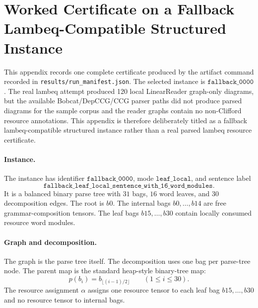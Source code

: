 \section{Worked Certificate on a Fallback Lambeq-Compatible Structured Instance}
\label{app:worked-experiment-certificate}

This appendix records one complete certificate produced by the artifact command recorded in \texttt{results/run\_manifest.json}.
The selected instance is \(\texttt{fallback\_0000}\). The real lambeq attempt produced 120 local LinearReader graph-only diagrams, but the available Bobcat/DepCCG/CCG parser paths did not produce parsed diagrams for the sample corpus and the reader graphs contain no non-Clifford resource annotations. This appendix is therefore deliberately titled as a fallback lambeq-compatible structured instance rather than a real parsed lambeq resource certificate.

\paragraph{Instance.}
The instance has identifier \(\texttt{fallback\_0000}\), mode \(\texttt{leaf\_local}\), and sentence label
\[
\texttt{fallback\_leaf\_local\_sentence\_with\_16\_word\_modules}.
\]
It is a balanced binary parse tree with \(31\) bags, \(16\) word leaves, and \(30\) decomposition edges. The root is \(b0\). The internal bags \(b0,\ldots,b14\) are free grammar-composition tensors. The leaf bags \(b15,\ldots,b30\) contain locally consumed resource word modules.

\paragraph{Graph and decomposition.}
The graph is the parse tree itself. The decomposition uses one bag per parse-tree node. The parent map is the standard heap-style binary-tree map:
\[
p(b_i)=b_{\lfloor (i-1)/2\rfloor}\qquad (1\le i\le 30).
\]
The resource assignment \(\alpha\) assigns one resource tensor to each leaf bag \(b15,\ldots,b30\) and no resource tensor to internal bags.

